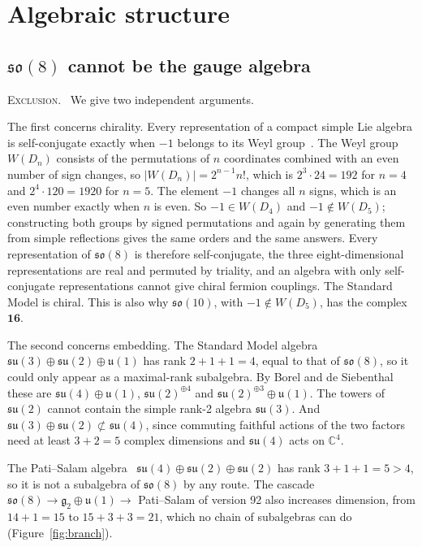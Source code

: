 \documentclass[a4paper,11pt]{article}
\makeatletter
\numberwithin{equation}{section}
\theoremstyle{jsplain}
\theoremstyle{jsrem}
\newcommand{\lbl}[1]{\textcolor{lbl@#1}{\textsc{#1}}.\ }
\makeatother
\begin{document}
\section{Algebraic structure}\label{sec:algebra}

\subsection{$\mathfrak{so}(8)$ cannot be the gauge algebra}

\lbl{Exclusion} We give two independent arguments.

The first concerns chirality. Every representation of a compact simple Lie algebra is self-conjugate exactly when $-1$ belongs to its Weyl group~\cite{ref21}. The Weyl group $W(D_n)$ consists of the permutations of $n$ coordinates combined with an even number of sign changes, so $|W(D_n)|=2^{n-1}n!$, which is $2^3\cdot24=192$ for $n=4$ and $2^4\cdot120=1920$ for $n=5$. The element $-1$ changes all $n$ signs, which is an even number exactly when $n$ is even. So $-1\in W(D_4)$ and $-1\notin W(D_5)$; constructing both groups by signed permutations and again by generating them from simple reflections gives the same orders and the same answers. Every representation of $\mathfrak{so}(8)$ is therefore self-conjugate, the three eight-dimensional representations are real and permuted by triality, and an algebra with only self-conjugate representations cannot give chiral fermion couplings. The Standard Model is chiral. This is also why $\mathfrak{so}(10)$, with $-1\notin W(D_5)$, has the complex $\mathbf{16}$.

The second concerns embedding. The Standard Model algebra $\mathfrak{su}(3)\oplus\mathfrak{su}(2)\oplus\mathfrak{u}(1)$ has rank $2+1+1=4$, equal to that of $\mathfrak{so}(8)$, so it could only appear as a maximal-rank subalgebra. By Borel and de Siebenthal~\cite{ref20} these are $\mathfrak{su}(4)\oplus\mathfrak{u}(1)$, $\mathfrak{su}(2)^{\oplus4}$ and $\mathfrak{su}(2)^{\oplus3}\oplus\mathfrak{u}(1)$. The towers of $\mathfrak{su}(2)$ cannot contain the simple rank-2 algebra $\mathfrak{su}(3)$. And $\mathfrak{su}(3)\oplus\mathfrak{su}(2)\not\subset\mathfrak{su}(4)$, since commuting faithful actions of the two factors need at least $3+2=5$ complex dimensions and $\mathfrak{su}(4)$ acts on $\mathbb{C}^4$.

The Pati--Salam algebra~\cite{ref22} $\mathfrak{su}(4)\oplus\mathfrak{su}(2)\oplus\mathfrak{su}(2)$ has rank $3+1+1=5>4$, so it is not a subalgebra of $\mathfrak{so}(8)$ by any route. The cascade $\mathfrak{so}(8)\to\mathfrak{g}_2\oplus\mathfrak{u}(1)\to$ Pati--Salam of version 92 also increases dimension, from $14+1=15$ to $15+3+3=21$, which no chain of subalgebras can do (Figure~\ref{fig:branch}).
\end{document}
